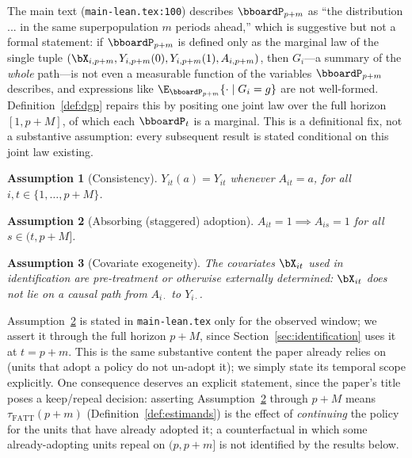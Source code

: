 \documentclass{article}
\renewcommand{\P}{\bboardP}
\newtheorem{assumption}{Assumption}
\begin{document}
\begin{remark}
\label{rem:joint-law}
The main text (\texttt{main-lean.tex:100}) describes $\P_{p+m}$ as ``the distribution ... in the same superpopulation $m$ periods ahead,'' which is suggestive but not a formal statement: if $\P_{p+m}$ is defined only as the marginal law of the single tuple $(\bX_{i,p+m}, Y_{i,p+m}(0), Y_{i,p+m}(1), A_{i,p+m})$, then $G_i$---a summary of the \emph{whole} path---is not even a measurable function of the variables $\P_{p+m}$ describes, and expressions like $\E_{\P_{p+m}}\{\cdot \mid G_i = g\}$ are not well-formed. Definition~\ref{def:dgp} repairs this by positing one joint law over the full horizon $[1,p+M]$, of which each $\P_t$ is a marginal. This is a definitional fix, not a substantive assumption: every subsequent result is stated conditional on this joint law existing.
\end{remark}

\begin{assumption}[Consistency]
\label{assump:consistency}
$Y_{it}(a) = Y_{it}$ whenever $A_{it} = a$, for all $i, t \in \{1,\ldots,p+M\}$.
\end{assumption}

\begin{assumption}[Absorbing (staggered) adoption]
\label{assump:absorbing}
$A_{it} = 1 \implies A_{is} = 1$ for all $s \in (t, p+M]$.
\end{assumption}

\begin{assumption}[Covariate exogeneity]
\label{assump:cov-exog}
The covariates $\bX_{it}$ used in identification are pre-treatment or otherwise externally determined: $\bX_{it}$ does not lie on a causal path from $A_{i\cdot}$ to $Y_{i\cdot}$.
\end{assumption}

Assumption~\ref{assump:absorbing} is stated in \texttt{main-lean.tex} only for the observed window; we assert it through the full horizon $p+M$, since Section~\ref{sec:identification} uses it at $t = p+m$. This is the same substantive content the paper already relies on (units that adopt a policy do not un-adopt it); we simply state its temporal scope explicitly. One consequence deserves an explicit statement, since the paper's title poses a keep/repeal decision: asserting Assumption~\ref{assump:absorbing} through $p+M$ means $\tau_{\mathrm{FATT}}(p+m)$ (Definition~\ref{def:estimands}) is the effect of \emph{continuing} the policy for the units that have already adopted it; a counterfactual in which some already-adopting units repeal on $(p,p+m]$ is not identified by the results below.
\end{document}
